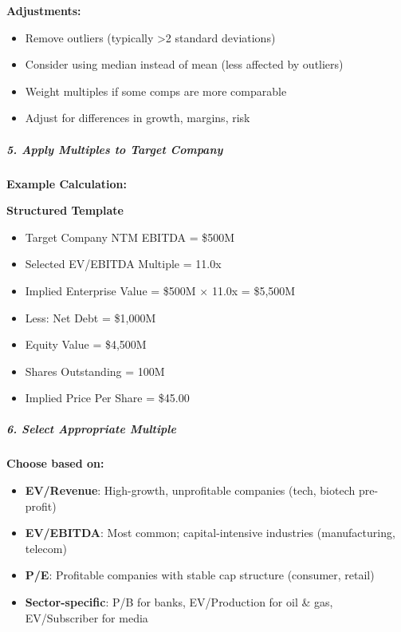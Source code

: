 \documentclass[11pt]{article}
\begin{document}
\textbf{Adjustments:}

\begin{itemize}[leftmargin=*,itemsep=2pt,topsep=2pt]
\item {} Remove outliers (typically >2 standard deviations)
\item {} Consider using median instead of mean (less affected by outliers)
\item {} Weight multiples if some comps are more comparable
\item {} Adjust for differences in growth, margins, risk
\end{itemize}

\subparagraph{5. Apply Multiples to Target Company}\mbox{}\par

\textbf{Example Calculation:}

\textbf{Structured Template}
\begin{itemize}[leftmargin=*,itemsep=2pt,topsep=2pt]
\item {} Target Company NTM EBITDA = \$500M
\item {} Selected EV/EBITDA Multiple = 11.0x
\item {} Implied Enterprise Value = \$500M × 11.0x = \$5,500M
\item {} Less: Net Debt = \$1,000M
\item {} Equity Value = \$4,500M
\item {} Shares Outstanding = 100M
\item {} Implied Price Per Share = \$45.00
\end{itemize}

\subparagraph{6. Select Appropriate Multiple}\mbox{}\par

\textbf{Choose based on:}

\begin{itemize}[leftmargin=*,itemsep=2pt,topsep=2pt]
\item {} \textbf{EV/Revenue}: High-growth, unprofitable companies (tech, biotech pre-profit)
\item {} \textbf{EV/EBITDA}: Most common; capital-intensive industries (manufacturing, telecom)
\item {} \textbf{P/E}: Profitable companies with stable cap structure (consumer, retail)
\item {} \textbf{Sector-specific}: P/B for banks, EV/Production for oil \& gas, EV/Subscriber for media
\end{itemize}
\end{document}
